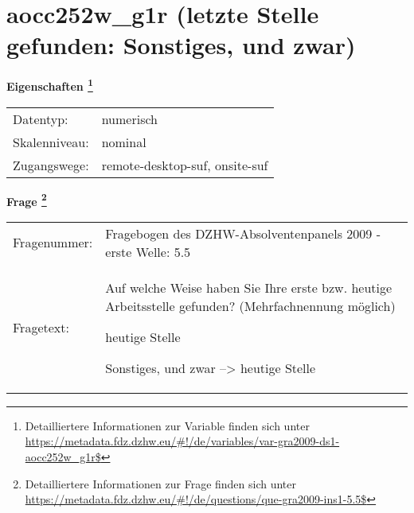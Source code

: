 
    \setcounter{footnote}{0}

    \vspace*{-1.8cm}
	\section{aocc252w\_g1r (letzte Stelle gefunden: Sonstiges, und zwar)}
	\label{section:aocc252w_g1r}



    \vspace*{0.5cm}
    \noindent\textbf{Eigenschaften
	\footnote{Detailliertere Informationen zur Variable finden sich unter
		\url{https://metadata.fdz.dzhw.eu/\#!/de/variables/var-gra2009-ds1-aocc252w_g1r$}}}\\
	\begin{tabularx}{\hsize}{@{}lX}
	Datentyp: & numerisch \\
	Skalenniveau: & nominal \\
	Zugangswege: &
	  remote-desktop-suf, 
	  onsite-suf
 \\
    \end{tabularx}



				\vspace*{0.5cm}
                \noindent\textbf{Frage
	                \footnote{Detailliertere Informationen zur Frage finden sich unter
		              \url{https://metadata.fdz.dzhw.eu/\#!/de/questions/que-gra2009-ins1-5.5$}}}\\
				\begin{tabularx}{\hsize}{@{}lX}
					Fragenummer: &
					  Fragebogen des DZHW-Absolventenpanels 2009 - erste Welle:
					  5.5
 \\
					Fragetext: & Auf welche Weise haben Sie Ihre erste bzw. heutige Arbeitsstelle gefunden? (Mehrfachnennung möglich)\par  heutige Stelle\par  Sonstiges, und zwar --\textgreater{} heutige Stelle \\
				\end{tabularx}





